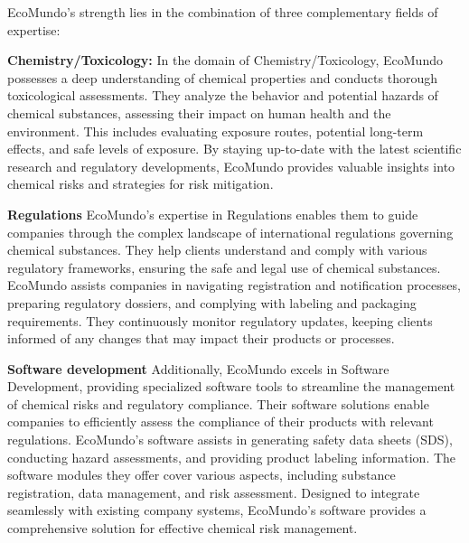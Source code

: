 \documentclass[a4paper,12pt,twoside]{report}
\begin{document}
EcoMundo's strength lies in the combination of three complementary fields of expertise:

\itemize[label=$\bullet$] 
\item \textbf{Chemistry/Toxicology:}
In the domain of Chemistry/Toxicology, EcoMundo possesses a deep understanding of chemical properties and conducts thorough toxicological assessments. They analyze the behavior and potential hazards of chemical substances, assessing their impact on human health and the environment. This includes evaluating exposure routes, potential long-term effects, and safe levels of exposure. By staying up-to-date with the latest scientific research and regulatory developments, EcoMundo provides valuable insights into chemical risks and strategies for risk mitigation.
\item \textbf{Regulations}
EcoMundo's expertise in Regulations enables them to guide companies through the complex landscape of international regulations governing chemical substances. They help clients understand and comply with various regulatory frameworks, ensuring the safe and legal use of chemical substances. EcoMundo assists companies in navigating registration and notification processes, preparing regulatory dossiers, and complying with labeling and packaging requirements. They continuously monitor regulatory updates, keeping clients informed of any changes that may impact their products or processes.
\item \textbf{Software development}
Additionally, EcoMundo excels in Software Development, providing specialized software tools to streamline the management of chemical risks and regulatory compliance. Their software solutions enable companies to efficiently assess the compliance of their products with relevant regulations. EcoMundo's software assists in generating safety data sheets (SDS), conducting hazard assessments, and providing product labeling information. The software modules they offer cover various aspects, including substance registration, data management, and risk assessment. Designed to integrate seamlessly with existing company systems, EcoMundo's software provides a comprehensive solution for effective chemical risk management.
\end{document}
